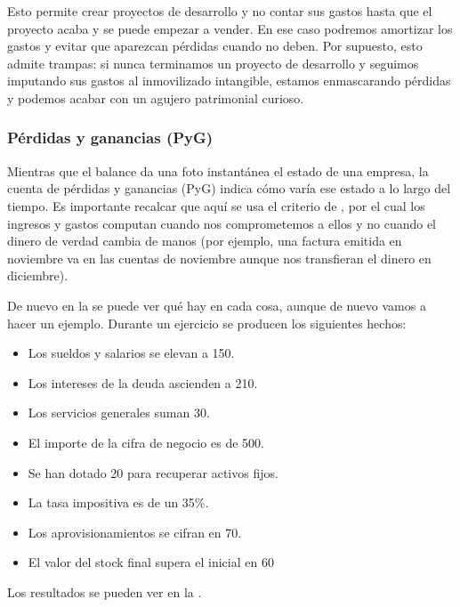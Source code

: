 \documentclass[nochap,palatino,shortheader]{apuntes}
\newcommand{\study}[1]{#1} \newcommand{\substudy}[1]{#1}
\begin{document}
Esto permite crear proyectos de desarrollo y no contar sus gastos hasta que el proyecto acaba y se puede empezar a vender.
En ese caso podremos amortizar los gastos y evitar que aparezcan pérdidas cuando no deben. Por supuesto, esto admite trampas: si nunca terminamos un proyecto de desarrollo y seguimos imputando sus gastos al inmovilizado intangible, estamos enmascarando pérdidas y podemos acabar con un agujero patrimonial curioso.

\subsubsection{Pérdidas y ganancias (PyG)}

Mientras que el balance da una foto instantánea el estado de una empresa, la \study{cuenta de pérdidas y ganancias (PyG)} indica \substudy{cómo varía ese estado a lo largo del tiempo}.
Es importante recalcar que aquí se usa el criterio de , por el cual los \substudy{ingresos y gastos computan cuando nos comprometemos} a ellos y no cuando el dinero de verdad cambia de manos (por ejemplo, una factura emitida en noviembre va en las cuentas de noviembre aunque nos transfieran el dinero en diciembre).

De nuevo en la  se puede ver qué hay en cada cosa, aunque de nuevo vamos a hacer un ejemplo. Durante un ejercicio se producen los siguientes hechos:

\begin{itemize}
\item Los sueldos y salarios se elevan a 150.
\item Los intereses de la deuda ascienden a 210.
\item Los servicios generales suman 30.
\item El importe de la cifra de negocio es de 500.
\item Se han dotado 20 para recuperar activos fijos.
\item La tasa impositiva es de un 35\%.
\item Los aprovisionamientos se cifran en 70.
\item El valor del stock final supera el inicial en 60
\end{itemize}

Los resultados se pueden ver en la .
\end{document}
